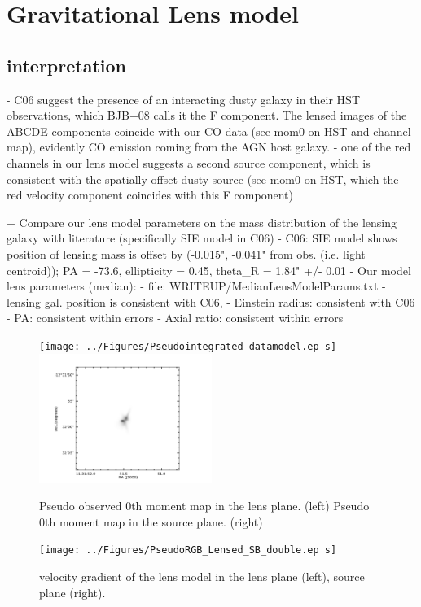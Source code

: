 \documentclass[]{emulateapj}
\begin{document}
\author{Draft}


\section{Gravitational Lens model}

\subsection{interpretation}
- C06 suggest the presence of an interacting dusty galaxy in their HST
observations, which BJB+08 calls it the F component. The lensed images of the
ABCDE 
components coincide with our CO data (see mom0 on HST and channel map),
evidently CO emission coming from the AGN host galaxy. 
- one of the red channels in our lens model suggests a second source component,
which is consistent with the spatially offset dusty source (see mom0 on HST,
which 
the red velocity component coincides with this F component)

+ Compare our lens model parameters on the mass distribution of the lensing
galaxy with literature (specifically SIE model in C06)
	- C06: SIE model shows position of lensing mass is offset by (-0.015",
-0.041" from obs. (i.e. light centroid)); PA = -73.6, ellipticity = 0.45,
theta_R = 1.84" +/- 0.01 
	- Our model lens parameters (median):
		- file: WRITEUP/MedianLensModelParams.txt
		- lensing gal. position is consistent with C06, 
		- Einstein radius: consistent with C06
		- PA: consistent within errors
		- Axial ratio: consistent within errors


\begin{figure}[tbph]
\centering
\texttt{[image: ../Figures/Pseudointegrated\_datamodel.ep
s]}
\includegraphics[width=0.50\textwidth]{../Figures/SourcesPlane.png}
\caption{
Pseudo observed 0th moment map in the lens plane. (left)
Pseudo 0th moment map in the source plane. (right)
\label{fig:}}
\end{figure}




\begin{figure}[tbph]
\centering
\texttt{[image: ../Figures/PseudoRGB\_Lensed\_SB\_double.ep
s]}
\caption{
velocity gradient of the lens model in the lens plane (left), source plane
(right).
\label{fig:}}
\end{figure}


\end{document}
